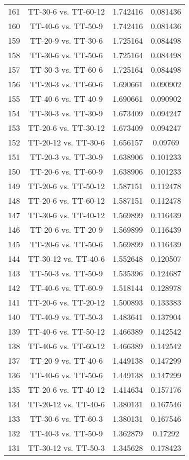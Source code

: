 \documentclass[a4paper,10pt]{article}
\begin{document}
\begin{landscape}
\begin{table}[!htp]
\begin{tabular}{cccc}
161&TT-30-6 vs. TT-60-12&1.742416&0.081436\\
160&TT-40-6 vs. TT-50-9&1.742416&0.081436\\
159&TT-20-9 vs. TT-30-6&1.725164&0.084498\\
158&TT-30-6 vs. TT-50-6&1.725164&0.084498\\
157&TT-30-3 vs. TT-60-6&1.725164&0.084498\\
156&TT-20-3 vs. TT-60-6&1.690661&0.090902\\
155&TT-40-6 vs. TT-40-9&1.690661&0.090902\\
154&TT-30-3 vs. TT-30-9&1.673409&0.094247\\
153&TT-20-6 vs. TT-30-12&1.673409&0.094247\\
152&TT-20-12 vs. TT-30-6&1.656157&0.09769\\
151&TT-20-3 vs. TT-30-9&1.638906&0.101233\\
150&TT-20-6 vs. TT-60-9&1.638906&0.101233\\
149&TT-20-6 vs. TT-50-12&1.587151&0.112478\\
148&TT-20-6 vs. TT-60-12&1.587151&0.112478\\
147&TT-30-6 vs. TT-40-12&1.569899&0.116439\\
146&TT-20-6 vs. TT-20-9&1.569899&0.116439\\
145&TT-20-6 vs. TT-50-6&1.569899&0.116439\\
144&TT-30-12 vs. TT-40-6&1.552648&0.120507\\
143&TT-50-3 vs. TT-50-9&1.535396&0.124687\\
142&TT-40-6 vs. TT-60-9&1.518144&0.128978\\
141&TT-20-6 vs. TT-20-12&1.500893&0.133383\\
140&TT-40-9 vs. TT-50-3&1.483641&0.137904\\
139&TT-40-6 vs. TT-50-12&1.466389&0.142542\\
138&TT-40-6 vs. TT-60-12&1.466389&0.142542\\
137&TT-20-9 vs. TT-40-6&1.449138&0.147299\\
136&TT-40-6 vs. TT-50-6&1.449138&0.147299\\
135&TT-20-6 vs. TT-40-12&1.414634&0.157176\\
134&TT-20-12 vs. TT-40-6&1.380131&0.167546\\
133&TT-30-6 vs. TT-60-3&1.380131&0.167546\\
132&TT-40-3 vs. TT-50-9&1.362879&0.17292\\
131&TT-30-12 vs. TT-50-3&1.345628&0.178423\\

\end{tabular}
\end{table}
\end{landscape}
\end{document}

